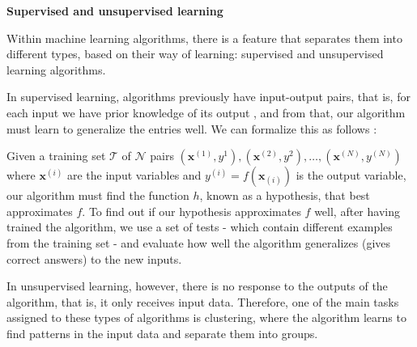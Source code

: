 \textbf{Supervised and unsupervised learning}

Within machine learning algorithms, there is a feature that separates them into different types, based on their way of learning: supervised and unsupervised learning algorithms.

In supervised learning, algorithms previously have input-output pairs, that is, for each input we have prior knowledge of its output \cite{russell2016}, and from that, our algorithm must learn to generalize the entries well. We can formalize this as follows \cite{russell2016}:

Given a training set $\mathcal{T}$ of $\mathcal{N}$ pairs $(\mathbf{x}^{(1)},y^1),(\mathbf{x}^{(2)},y^2),\dots,(\mathbf{x}^{(N)},y^{(N)})$ where $\mathbf{x}^{(i)}$ are the input variables and $y^{(i)}=f(\mathbf{x}_{(i)})$ is the output variable, our algorithm must find the function $h$, known as a hypothesis, that best approximates $f$. To find out if our hypothesis approximates $f$ well, after having trained the algorithm, we use a set of tests - which contain different examples from the training set - and evaluate how well the algorithm generalizes (gives correct answers) to the new inputs.

In unsupervised learning, however, there is no response to the outputs of the algorithm, that is, it only receives input data. Therefore, one of the main tasks assigned to these types of algorithms is clustering, where the algorithm learns to find patterns in the input data and separate them into groups.





%
